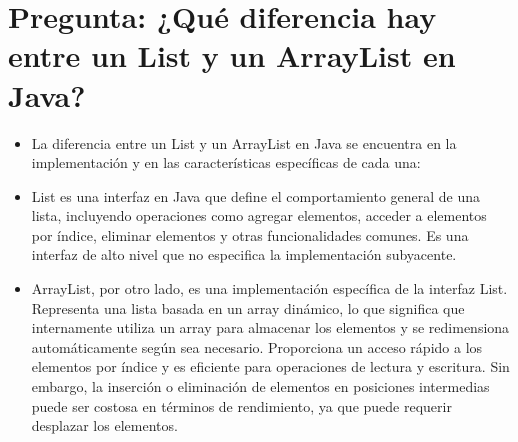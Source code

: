 \documentclass{article}
\begin{document}
\section{Pregunta: ¿Qué diferencia hay entre un List y un ArrayList en Java?
}
	\begin{itemize}
		\item La diferencia entre un List y un ArrayList en Java se encuentra en la implementación y en las características específicas de cada una:
		\item List es una interfaz en Java que define el comportamiento general de una lista, incluyendo operaciones como agregar elementos, acceder a elementos por índice, eliminar elementos y otras funcionalidades comunes. Es una interfaz de alto nivel que no especifica la implementación subyacente.
		\item ArrayList, por otro lado, es una implementación específica de la interfaz List. Representa una lista basada en un array dinámico, lo que significa que internamente utiliza un array para almacenar los elementos y se redimensiona automáticamente según sea necesario. Proporciona un acceso rápido a los elementos por índice y es eficiente para operaciones de lectura y escritura. Sin embargo, la inserción o eliminación de elementos en posiciones intermedias puede ser costosa en términos de rendimiento, ya que puede requerir desplazar los elementos.
		
	\end{itemize}	
\end{document}

